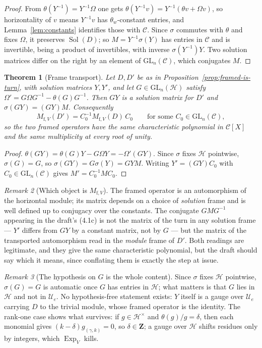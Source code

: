 \documentclass[11pt]{article}
\newtheorem{theorem}{Theorem}
\theoremstyle{definition}
\theoremstyle{remark}
\newtheorem{remark}[theorem]{Remark}
\newcommand{\Z}{\mathbf Z}
\begin{document}
\begin{proof}
From $\theta(Y^{-1})=Y^{-1}\Omega$ one gets $\theta(Y^{-1}v)=Y^{-1}(\theta
v+\Omega v)$, so horizontality of $v$ means $Y^{-1}v$ has $\theta_w$-constant
entries, and Lemma~\ref{lem:constants} identifies those with $\mathcal C$. Since
$\sigma$ commutes with $\theta$ and fixes $\Omega$, it preserves
$\operatorname{Sol}(D)$; so $M=Y^{-1}\sigma(Y)$ has entries in $\mathcal C$ and
is invertible, being a product of invertibles, with inverse
$\sigma(Y^{-1})Y$. Two solution matrices differ on the right by an element of
$\mathrm{GL}_n(\mathcal C)$, which conjugates $M$.
\end{proof}

\begin{theorem}[Frame transport]
\label{thm:transport}
Let $D,D'$ be as in Proposition~\ref{prop:framed-is-turn}, with solution
matrices $Y,Y'$, and let $G\in\mathrm{GL}_n(\mathcal H)$ satisfy
$\Omega'=G\Omega G^{-1}-\theta(G)G^{-1}$. Then $GY$ is a solution matrix for
$D'$ and $\sigma(GY)=(GY)M$. Consequently
\[
  M_{\mathrm f,V}(D')=C_0^{-1}M_{\mathrm f,V}(D)\,C_0
  \qquad\text{for some }C_0\in\mathrm{GL}_n(\mathcal C),
\]
so the two framed operators have the same characteristic polynomial in
$\mathcal C[X]$ and the same multiplicity at every root of unity.
\end{theorem}

\begin{proof}
$\theta(GY)=\theta(G)Y-G\Omega Y=-\Omega'(GY)$. Since $\sigma$ fixes
$\mathcal H$ pointwise, $\sigma(G)=G$, so $\sigma(GY)=G\sigma(Y)=GYM$. Writing
$Y'=(GY)C_0$ with $C_0\in\mathrm{GL}_n(\mathcal C)$ gives $M'=C_0^{-1}MC_0$.
\end{proof}

\begin{remark}[Which object is $M_{\mathrm f,V}$]
The framed operator is an automorphism of the horizontal module; its matrix
depends on a choice of \emph{solution} frame and is well defined up to
conjugacy over the constants. The conjugate $GM G^{-1}$ appearing in the draft's
(4.1c) is not the matrix of the turn in any solution frame --- $Y'$ differs from
$GY$ by a constant matrix, not by $G$ --- but the matrix of the transported
automorphism read in the \emph{module} frame of $D'$. Both readings are
legitimate, and they give the same characteristic polynomial, but the draft
should say which it means, since conflating them is exactly the step at issue.
\end{remark}

\begin{remark}[The hypothesis on $G$ is the whole content]
Since $\sigma$ fixes $\mathcal H$ pointwise, $\sigma(G)=G$ is automatic once $G$
has entries in $\mathcal H$; what matters is that $G$ lies in $\mathcal H$ and
not in $\mathcal U_e$. No hypothesis-free statement exists: $Y$ itself is a
gauge over $\mathcal U_e$ carrying $D$ to the trivial module, whose framed
operator is the identity. The rank-one case shows what survives: if
$g\in\mathcal H^\times$ and $\theta(g)/g=\delta$, then each monomial gives
$(k-\delta)g_{(\gamma,k)}=0$, so $\delta\in\Z$; a gauge over $\mathcal H$ shifts
residues only by integers, which $\operatorname{Exp}_V$ kills.
\end{remark}
\end{document}
